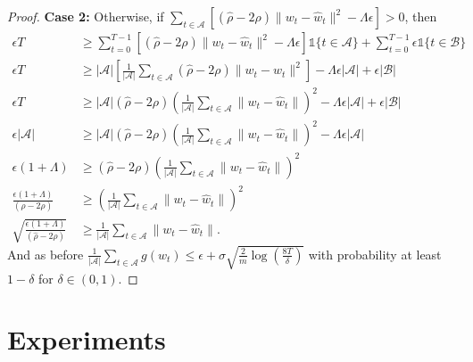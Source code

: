 \documentclass{article} %
\def\A{{\mathcal A}}
\def\B{{\mathcal B}}
\begin{document}
\begin{proof}
    \textbf{Case 2:} Otherwise, if $\sum_{t \in \A}[(\hat{\rho}-2\rho)\|w_t - \hat{w}_t\|^2 - {\Lambda} \epsilon] > 0$, then
    \begin{align*}
        \epsilon T &\geq \sum_{t=0}^{T-1}[(\hat{\rho}-2\rho)\|w_t - \hat{w}_t\|^2 - {\Lambda} \epsilon]\mathds{1}\{t \in \A\} + \sum_{t=0}^{T-1} \epsilon \mathds{1}\{t \in \B\}  
        \\
        \epsilon T&\geq |\A|\left[\frac{1}{|\A|}\sum_{t \in \A}(\hat{\rho}-2\rho)\|w_t - \hat{w}_t\|^2\right] - {\Lambda} \epsilon|\A| + \epsilon|\B|
        \\
       \epsilon T &\geq |\A|(\hat{\rho}-2\rho)\left(\frac{1}{|\A|}\sum_{t \in \A}\|w_{t} - \hat{w}_t\|\right)^2 - {\Lambda} \epsilon|\A| + \epsilon|\B|
       \\
       \epsilon|\A| &\geq |\A|(\hat{\rho}-2\rho)\left(\frac{1}{|\A|}\sum_{t \in \A}\|w_{t} - \hat{w}_t\|\right)^2 - {\Lambda} \epsilon|\A|
       \\
       \epsilon(1+\Lambda) &\geq (\hat{\rho}-2\rho)\left(\frac{1}{|\A|}\sum_{t \in \A}\|w_{t} - \hat{w}_t\|\right)^2
       \\
       \frac{\epsilon(1+\Lambda)}{(\hat{\rho}-2\rho)} &\geq \left(\frac{1}{|\A|}\sum_{t \in \A}\|w_{t} - \hat{w}_t\|\right)^2
       \\
       \sqrt{\frac{\epsilon(1+\Lambda)}{(\hat{\rho}-2\rho)}} &\geq \frac{1}{|\A|}\sum_{t \in \A}\|w_{t} - \hat{w}_t\|
       . 
    \end{align*}
    And as before $\frac{1}{|\A|} \sum_{t\in \A}g(w_t) \leq \epsilon + \sigma \sqrt{\frac{2}{m} \log\left(\frac{8T}{\delta}\right)}$ with probability at least $1-\delta$ for $\delta \in (0,1)$.
 \end{proof}
\section{Experiments}
\label{apdx:exp}
\end{document}
